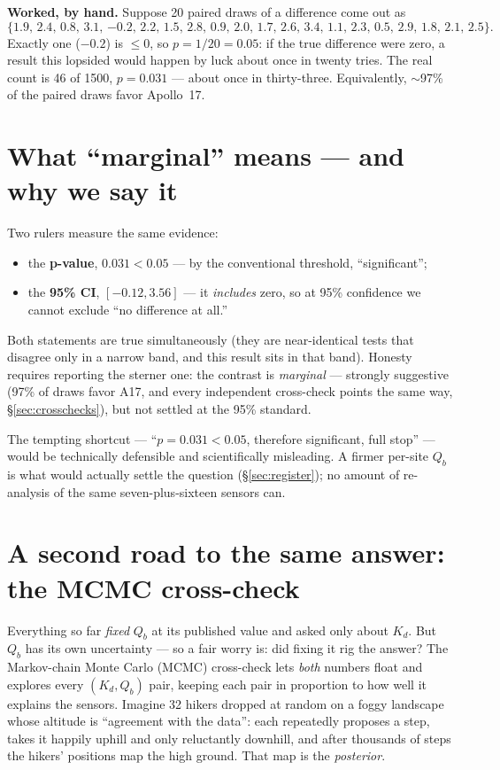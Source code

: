 \documentclass[11pt]{report}
\begin{document}
\noindent\textbf{Worked, by hand.} Suppose 20 paired draws of a difference
come out as
\[
\{1.9,\, 2.4,\, 0.8,\, 3.1,\, {-0.2},\, 2.2,\, 1.5,\, 2.8,\, 0.9,\, 2.0,\,
1.7,\, 2.6,\, 3.4,\, 1.1,\, 2.3,\, 0.5,\, 2.9,\, 1.8,\, 2.1,\, 2.5\}.
\]
Exactly one ($-0.2$) is $\leq 0$, so $p = 1/20 = 0.05$: if the true
difference were zero, a result this lopsided would happen by luck about once
in twenty tries. The real count is 46 of 1500, $p = 0.031$ --- about once in
thirty-three. Equivalently, $\sim$97\% of the paired draws favor Apollo~17.

\section{What ``marginal'' means --- and why we say it}\label{sec:marginalzero}

Two rulers measure the same evidence:
\begin{itemize}[leftmargin=1.4em,itemsep=2pt]
\item the \textbf{p-value}, $0.031 < 0.05$ --- by the conventional threshold,
  ``significant'';
\item the \textbf{95\% CI}, $[-0.12, 3.56]$ --- it \emph{includes} zero, so
  at 95\% confidence we cannot exclude ``no difference at all.''
\end{itemize}
Both statements are true simultaneously (they are near-identical tests that
disagree only in a narrow band, and this result sits in that band). Honesty
requires reporting the sterner one: the contrast is \emph{marginal} ---
strongly suggestive (97\% of draws favor A17, and every independent
cross-check points the same way, \S\ref{sec:crosschecks}), but not settled at
the 95\% standard.

\begin{warn}
The tempting shortcut --- ``$p=0.031<0.05$, therefore significant, full
stop'' --- would be technically defensible and scientifically misleading. A
firmer per-site $Q_b$ is what would actually settle the question
(\S\ref{sec:register}); no amount of re-analysis of the same seven-plus-sixteen
sensors can.
\end{warn}

\section{A second road to the same answer: the MCMC
cross-check}\label{sec:mcmczero}

\begin{plain}
Everything so far \emph{fixed} $Q_b$ at its published value and asked only
about $K_d$. But $Q_b$ has its own uncertainty --- so a fair worry is: did
fixing it rig the answer? The Markov-chain Monte Carlo (MCMC) cross-check
lets \emph{both} numbers float and explores every $(K_d, Q_b)$ pair, keeping
each pair in proportion to how well it explains the sensors. Imagine 32
hikers dropped at random on a foggy landscape whose altitude is ``agreement
with the data'': each repeatedly proposes a step, takes it happily uphill and
only reluctantly downhill, and after thousands of steps the hikers' positions
map the high ground. That map is the \emph{posterior}.
\end{plain}
\end{document}

